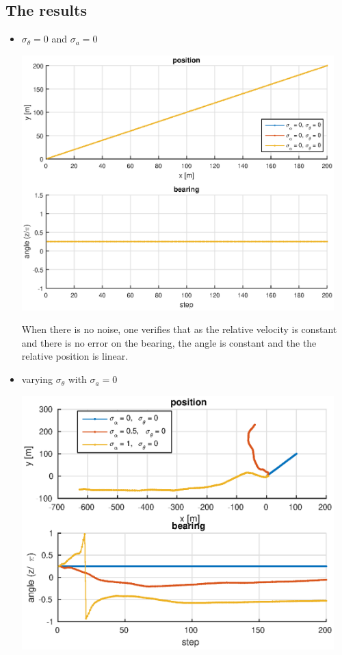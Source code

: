 \documentclass[english,DIV=13]{scrartcl}
\begin{document}
\subsection*{The results}
\newpage
\begin{itemize}
\item $\sigma_\theta=0$ and $\sigma_a=0$\\

	\begin{minipage}{.5\textwidth}
		\includegraphics[width=0.95\textwidth]{img/q2_1.eps}
	\end{minipage}%
	\begin{minipage}{.5\textwidth}
		When there is no noise, one verifies that as the relative velocity is constant and there is no error on
		the bearing, the angle is constant and the the relative position is linear.
	\end{minipage}
\item varying $\sigma_\theta$ with $\sigma_a=0$
\begin{center}
	\begin{minipage}{.5\textwidth}
		\includegraphics[width=0.95\textwidth]{img/q2_2.eps}

\end{minipage}
\end{center}
\end{itemize}
\end{document}
